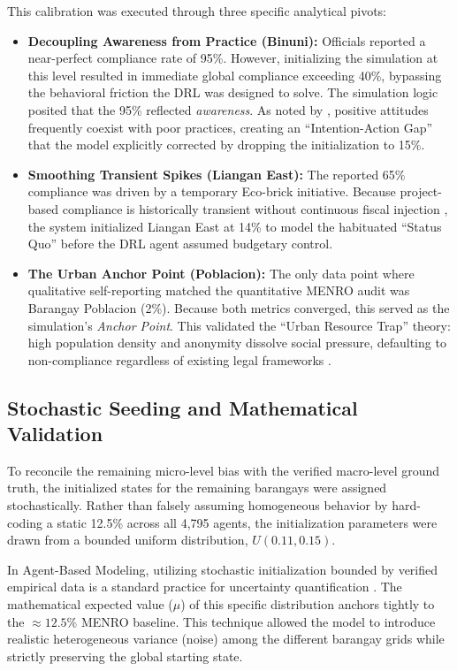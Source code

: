 This calibration was executed through three specific analytical pivots:
\begin{itemize}
    \item \textbf{Decoupling Awareness from Practice (Binuni):} Officials reported a near-perfect compliance rate of 95\%. However, initializing the simulation at this level resulted in immediate global compliance exceeding 40\%, bypassing the behavioral friction the DRL was designed to solve. The simulation logic posited that the 95\% reflected \textit{awareness}. As noted by \cite{Paigalan2025}, positive attitudes frequently coexist with poor practices, creating an ``Intention-Action Gap'' that the model explicitly corrected by dropping the initialization to 15\%.
    \item \textbf{Smoothing Transient Spikes (Liangan East):} The reported 65\% compliance was driven by a temporary Eco-brick initiative. Because project-based compliance is historically transient without continuous fiscal injection \citep{Camarillo2021}, the system initialized Liangan East at 14\% to model the habituated ``Status Quo'' before the DRL agent assumed budgetary control.
    \item \textbf{The Urban Anchor Point (Poblacion):} The only data point where qualitative self-reporting matched the quantitative MENRO audit was Barangay Poblacion (2\%). Because both metrics converged, this served as the simulation's \textit{Anchor Point}. This validated the ``Urban Resource Trap'' theory: high population density and anonymity dissolve social pressure, defaulting to non-compliance regardless of existing legal frameworks \citep{Villanueva2021}.
\end{itemize}

\subsection{Stochastic Seeding and Mathematical Validation}
To reconcile the remaining micro-level bias with the verified macro-level ground truth, the initialized states for the remaining barangays were assigned stochastically. Rather than falsely assuming homogeneous behavior by hard-coding a static 12.5\% across all 4,795 agents, the initialization parameters were drawn from a bounded uniform distribution, $U(0.11, 0.15)$. 

In Agent-Based Modeling, utilizing stochastic initialization bounded by verified empirical data is a standard practice for uncertainty quantification \citep{McCulloch2022, Fischer2025}. The mathematical expected value ($\mu$) of this specific distribution anchors tightly to the $\approx 12.5\%$ MENRO baseline. This technique allowed the model to introduce realistic heterogeneous variance (noise) among the different barangay grids while strictly preserving the global starting state.

